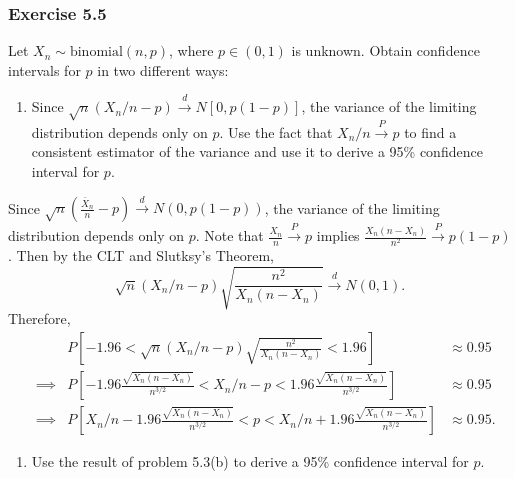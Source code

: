\documentclass[12pt,]{article}
\providecommand{\tightlist}{%
  \setlength{\itemsep}{0pt}\setlength{\parskip}{0pt}}
\begin{document}
\hypertarget{exercise-5.5}{%
\subsubsection{Exercise 5.5}\label{exercise-5.5}}

Let \(X_n\sim \text{binomial}(n,p)\), where \(p\in(0,1)\) is unknown.
Obtain confidence intervals for \(p\) in two different ways:

\begin{enumerate}
\def\labelenumi{(\alph{enumi})}
\tightlist
\item
  Since \(\sqrt{n}(X_n/n-p)\overset{d}\rightarrow N[0,p(1-p)]\), the
  variance of the limiting distribution depends only on \(p\). Use the
  fact that \(X_n/n\overset{P}\rightarrow p\) to find a consistent
  estimator of the variance and use it to derive a 95\% confidence
  interval for \(p\).
\end{enumerate}

Since
\(\sqrt{n}\left(\frac{\bar X_n}{n}-p\right)\overset{d}\rightarrow N(0,p(1-p))\),
the variance of the limiting distribution depends only on \(p\). Note
that \(\frac{X_n}{n}\overset{P}\rightarrow p\) implies
\(\frac{X_n(n-X_n)}{n^2}\overset{P}\rightarrow p(1-p)\). Then by the CLT
and Slutksy's Theorem,
\[\sqrt{n}(X_n/n-p)\sqrt{\frac{n^2}{X_n(n-X_n)}}\overset{d}\rightarrow N(0,1).\]
Therefore, \begin{align*}
&&P\left[-1.96<\sqrt{n}(X_n/n-p)\sqrt{\frac{n^2}{X_n(n-X_n)}}<1.96\right] & \approx 0.95\\
&\implies& P\left[-1.96\frac{\sqrt{X_n(n-X_n)}}{n^{3/2}}<X_n/n-p<1.96\frac{\sqrt{X_n(n-X_n)}}{n^{3/2}}\right] & \approx 0.95\\
&\implies& P\left[X_n/n-1.96\frac{\sqrt{X_n(n-X_n)}}{n^{3/2}}<p<X_n/n+1.96\frac{\sqrt{X_n(n-X_n)}}{n^{3/2}}\right] &\approx 0.95.
\end{align*}

\begin{enumerate}
\def\labelenumi{(\alph{enumi})}
\setcounter{enumi}{1}
\tightlist
\item
  Use the result of problem 5.3(b) to derive a 95\% confidence interval
  for \(p\).
\end{enumerate}
\end{document}
